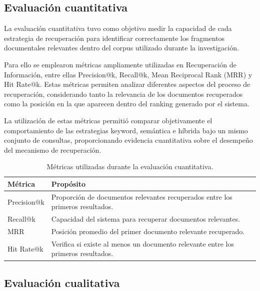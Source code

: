 \subsection{Evaluación cuantitativa}

La evaluación cuantitativa tuvo como objetivo medir la capacidad de cada estrategia de recuperación para identificar correctamente los fragmentos documentales relevantes dentro del corpus utilizado durante la investigación.

Para ello se emplearon métricas ampliamente utilizadas en Recuperación de Información, entre ellas Precision@k, Recall@k, Mean Reciprocal Rank (MRR) y Hit Rate@k. Estas métricas permiten analizar diferentes aspectos del proceso de recuperación, considerando tanto la relevancia de los documentos recuperados como la posición en la que aparecen dentro del ranking generado por el sistema.

La utilización de estas métricas permitió comparar objetivamente el comportamiento de las estrategias keyword, semántica e híbrida bajo un mismo conjunto de consultas, proporcionando evidencia cuantitativa sobre el desempeño del mecanismo de recuperación.

\begin{table}[H]
\centering
\caption{Métricas utilizadas durante la evaluación cuantitativa.}
\label{tab:metrics}

\begin{tabular}{p{4cm}p{8.5cm}}
\hline
\textbf{Métrica} & \textbf{Propósito}\\
\hline

Precision@k &
Proporción de documentos relevantes recuperados entre los primeros resultados.\\

Recall@k &
Capacidad del sistema para recuperar documentos relevantes.\\

MRR &
Posición promedio del primer documento relevante recuperado.\\

Hit Rate@k &
Verifica si existe al menos un documento relevante entre los primeros resultados.\\

\hline
\end{tabular}

\end{table}

\subsection{Evaluación cualitativa}

